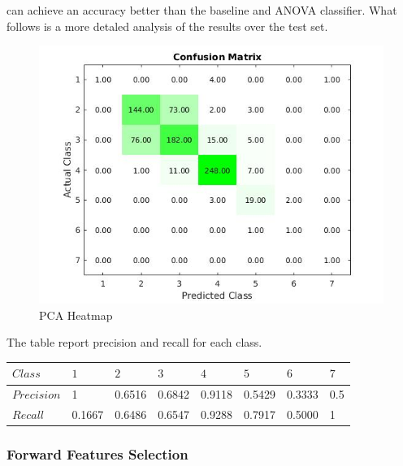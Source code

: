 \documentclass[a4paper,10pt]{article}
\begin{document}
      can achieve an accuracy better than the baseline and ANOVA classifier.\newline
      What follows is a more detaled analysis of the results over the test set.
      \begin{figure}[H]
	\centering
	\includegraphics[scale=0.5]{pca-heat.jpg}
	\caption{PCA Heatmap}
      \end{figure}
      The table report precision and recall for each class.
      \begin{table}[H]
      	\centering
	\begin{tabular}{l|P{1cm}P{1cm}P{1cm}P{1cm}P{1cm}P{1cm}P{1cm}} \toprule
	  {$Class$} & {$1$} & {$2$} & {$3$} & {$4$} & {$5$} & {$6$} & {$7$} \\ \midrule
	  $Precision$  & 1  &  0.6516 & 0.6842 & 0.9118 & 0.5429 & 0.3333 & 0.5 \\ \midrule
	  $Recall$  & 0.1667 & 0.6486 & 0.6547 & 0.9288 & 0.7917 & 0.5000 & 1  \\ \bottomrule
	\end{tabular}
      \end{table}

     \subsubsection{Forward Features Selection}
     
\end{document}
